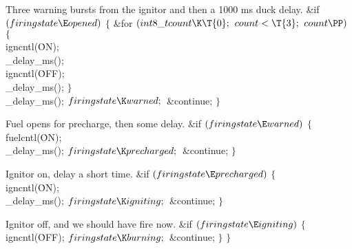Three warning bursts from the ignitor and then a 1000 ms duck delay.
\Y\B\&{if} ${}(\\{firingstate}\E\\{opened}){}$\5
${}\{{}$\1\7
\&{for} ${}(\\{int8\_t}\\{count}\K\T{0};{}$ ${}\\{count}<\T{3};{}$ ${}\\{count}%
\PP){}$\5
${}\{{}$\1\6
\\{igncntl}(\.{ON});\6
\\{\_delay\_ms}();\6
\\{igncntl}(\.{OFF});\6
\\{\_delay\_ms}();\6
\4${}\}{}$\2\6
\\{\_delay\_ms}();\6
${}\\{firingstate}\K\\{warned};{}$\6
\&{continue};\6
\4${}\}{}$\2\par
\fi

Fuel opens for precharge, then some delay.
\Y\B\&{if} ${}(\\{firingstate}\E\\{warned}){}$\5
${}\{{}$\1\7
\\{fuelcntl}(\.{ON});\6
\\{\_delay\_ms}();\6
${}\\{firingstate}\K\\{precharged};{}$\6
\&{continue};\6
\4${}\}{}$\2\par
\fi

Ignitor on, delay a short time.
\Y\B\&{if} ${}(\\{firingstate}\E\\{precharged}){}$\5
${}\{{}$\1\7
\\{igncntl}(\.{ON});\6
\\{\_delay\_ms}();\6
${}\\{firingstate}\K\\{igniting};{}$\6
\&{continue};\6
\4${}\}{}$\2\par
\fi

Ignitor off, and we should have fire now.
\Y\B\&{if} ${}(\\{firingstate}\E\\{igniting}){}$\5
${}\{{}$\1\7
\\{igncntl}(\.{OFF});\6
${}\\{firingstate}\K\\{burning};{}$\6
\&{continue};\6
\4${}\}{}$\2\6
$\}{}$\par
\fi

